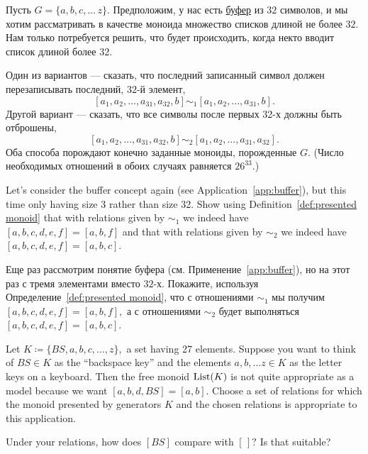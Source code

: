 \documentclass[../main/CT4S-EN-RU]{subfiles}
\begin{document}
\begin{applicationRUS}[Буфер]\label{app:buffer}
Пусть $G=\{a,b,c,\ldots\,z\}.$ Предположим, у нас есть \href{https://ru.wikipedia.org/wiki/%D0%91%D1%83%D1%84%D0%B5%D1%80_(%D0%B8%D0%BD%D1%84%D0%BE%D1%80%D0%BC%D0%B0%D1%82%D0%B8%D0%BA%D0%B0)}{\text буфер} из $32$ символов, и мы хотим рассматривать в качестве моноида множество списков длиной не более $32.$ Нам только потребуется решить, что будет происходить, когда некто вводит список длиной более $32$.

Один из вариантов — сказать, что последний записанный символ должен перезаписывать последний, $32$-й элемент, $$[a_1,a_2,\ldots,a_{31},a_{32},b]\sim_1[a_1,a_2,\ldots,a_{31},b].$$ Другой вариант — сказать, что все символы после первых 32-х должны быть отброшены, $$[a_1,a_2,\ldots,a_{31},a_{32},b]\sim_2[a_1,a_2,\ldots,a_{31},a_{32}].$$ Оба способа порождают конечно заданные моноиды, порожденные $G.$ (Число необходимых отношений в обоих случаях равняется $26^{33}.$)
\end{applicationRUS}

\begin{exerciseENG}\label{exc:buffer3}
Let's consider the buffer concept again (see Application~\ref{app:buffer}), but this time only having size 3 rather than size 32. Show using Definition~\ref{def:presented monoid} that with relations given by $\sim_1$ we indeed have $[a,b,c,d,e,f]=[a,b,f]$ and that with relations given by $\sim_2$ we indeed have $[a,b,c,d,e,f]=[a,b,c].$
\end{exerciseENG}

\begin{exerciseRUS}\label{exc:buffer3}
Еще раз рассмотрим понятие буфера (см. Применение~\ref{app:buffer}), но на этот раз с тремя элементами вместо $32$-х. Покажите, используя Определение~\ref{def:presented monoid}, что с отношениями $\sim_1$ мы получим $[a,b,c,d,e,f]=[a,b,f],$ а с отношениями $\sim_2$ будет выполняться $[a,b,c,d,e,f]=[a,b,c].$
\end{exerciseRUS}

\begin{exerciseENG}
Let $K{\coloneqq}\{BS,a,b,c,\ldots,z\},$ a set having 27 elements. Suppose you want to think of $BS\in K$ as the “backspace key” and the elements $a,b,\ldots z\in K$ as the letter keys on a keyboard. Then the free monoid $\operatorname{List}(K)$ is not quite appropriate as a model because we want $[a,b,d,BS]=[a,b].$
\sexc Choose a set of relations for which the monoid presented by generators $K$ and the chosen relations is appropriate to this application.
\item Under your relations, how does $[BS]$ compare with $[\,]?$ Is that suitable?
\endsexc
\end{exerciseENG}
\end{document}
